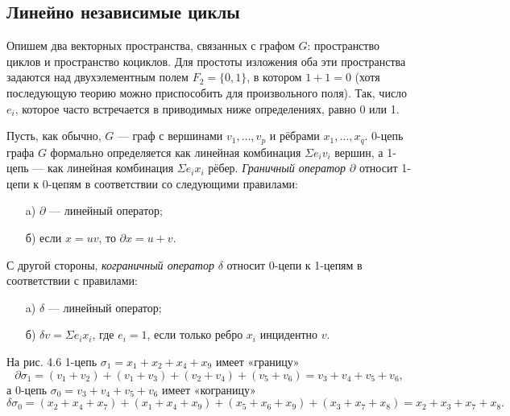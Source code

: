 \subsection{Линейно независимые циклы}
Опишем два векторных пространства, связанных с графом $G$: пространство циклов и пространство коциклов. Для простоты изложения оба эти пространства задаются над двухэлементным полем $F_2 = \{0, 1\}$, в котором $1 + 1 = 0$ (хотя последующую теорию можно приспособить для произвольного поля). Так, число $e_i$, которое часто встречается в приводимых ниже определениях, равно 0 или 1.

Пусть, как обычно, $G$ — граф с вершинами $v_1, \ldots, v_p$ и рёбрами $x_1, \ldots, x_q$. 0-цепь графа $G$ формально определяется как линейная комбинация $\Sigma e_i v_i$ вершин, а 1-цепь — как линейная комбинация $\Sigma e_i x_i$ рёбер. \textit{Граничный оператор} $\partial$ относит 1-цепи к 0-цепям в соответствии со следующими правилами:
\begin{itemize}
    \item[a)] $\partial$ — линейный оператор;
    \item[б)] если $x = uv$, то $\partial x = u + v$.
\end{itemize}

С другой стороны, \textit{кограничный оператор} $\delta$ относит 0-цепи к 1-цепям в соответствии с правилами:
\begin{itemize}
    \item[a)] $\delta$ — линейный оператор;
    \item[б)] $\delta v = \Sigma e_i x_i$, где $e_i = 1$, если только ребро $x_i$ инцидентно $v$.
\end{itemize}

На рис. 4.6 1-цепь $\sigma_1 = x_1 + x_2 + x_4 + x_9$ имеет «границу»
\[
    \partial \sigma_1 = (v_1 + v_2) + (v_1 + v_3) + (v_2 + v_4) + (v_5 + v_6) = v_3 + v_4 + v_5 + v_6,
\]
а 0-цепь $\sigma_0 = v_3 + v_4 + v_5 + v_6$ имеет «кограницу»
\[
    \delta \sigma_0 = (x_2 + x_4 + x_7) + (x_1 + x_4 + x_9) + (x_5 + x_6 + x_9) + (x_3 + x_7 + x_8) = x_2 + x_3 + x_7 + x_8.
\]

